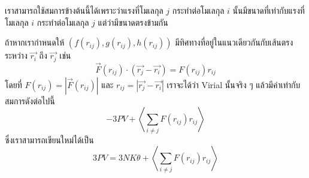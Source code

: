 เราสามารถใช้สมการข้างต้นนี้ได้เพราะว่าแรงที่โมเลกุล $j$ กระทำต่อโมเลกุล $i$ นั้นมีขนาดที่เท่ากับแรงที่โมเลกุล $i$ กระทำต่อโมเลกุล $j$ แต่ว่ามีขนาดตรงข้ามกัน

ถ้าหากเรากำหนดให้ $\left(f\left( r_{ij}\right) ,g\left( r_{ij}\right) ,h\left(r_{ij}\right) \right) $ มีทิศทางที่อยู่ในแนวเดียวกันกับเส้นตรงระหว่าง $\vec{r_i}$ ถึง $\vec{r_j}$ เช่น
%
\begin{equation}
    \vec{F}(r_{ij}) \cdot (\vec{r_j} - \vec{r_i})
    =
    F\left( r_{ij}\right) r_{ij}
\end{equation}
%
โดยที่ $F\left( r_{ij}\right) =\left| \vec{F}(r_{ij})\right| $ และ $r_{ij}=\left| \vec{r_j} - \vec{r_i}\right|$ เราจะได้ว่า Virial นั้นจริง ๆ แล้วมีค่าเท่ากับสมการดังต่อไปนี้
%
\begin{equation}
    -3PV+\left\langle \sum_{i\neq j}F\left( r_{ij}\right) r_{ij}\right\rangle
\end{equation}
%
ซึ่งเราสามารถเขียนใหม่ได้เป็น
%
\begin{equation}
    3PV 
    = 
    3NK\theta + 
    \left\langle \sum_{i\neq j}F\left( r_{ij}\right) r_{ij}\right\rangle
\end{equation}
